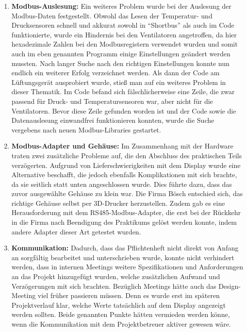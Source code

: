 \begin{enumerate}
	\item \textbf{Modbus-Auslesung:} Ein weiteres Problem wurde bei der Auslesung der Modbus-Daten festgestellt. Obwohl das Lesen der Temperatur- und Drucksensoren schnell und akkurat sowohl in \enquote{Shortbus} als auch im Code funktionierte, wurde ein Hindernis bei den Ventilatoren angetroffen, da hier hexadezimale Zahlen bei den Modbusregistern verwendet wurden und somit auch im eben genannten Programm einige Einstellungen geändert werden mussten. Nach langer Suche nach den richtigen Einstellungen konnte nun endlich ein weiterer Erfolg verzeichnet werden. Als dann der Code am Lüftungsgerät ausprobiert wurde, stieß man auf ein weiteres Problem in dieser Thematik. Im Code befand sich fälschlicherweise eine Zeile, die zwar passend für Druck- und Temperatursensoren war, aber nicht für die Ventilatoren. Bevor diese Zeile gefunden worden ist und der Code sowie die Datenauslesung einwandfrei funktionieren konnten, wurde die Suche vergebens nach neuen Modbus-Libraries gestartet.
	\item \textbf{Modbus-Adapter und Gehäuse:} Im Zusammenhang mit der Hardware traten zwei zusätzliche Probleme auf, die den Abschluss des praktischen Teils verzögerten. Aufgrund von Lieferschwierigkeiten mit dem Display wurde eine Alternative beschafft, die jedoch ebenfalls Komplikationen mit sich brachte, da sie seitlich statt unten angeschlossen wurde. Dies führte dazu, dass das zuvor ausgewählte Gehäuse zu klein war. Die Firma Bösch entschied sich, das richtige Gehäuse selbst per 3D-Drucker herzustellen. Zudem gab es eine Herausforderung mit dem RS485-Modbus-Adapter, die erst bei der Rückkehr in die Firma nach Beendigung des Praktikums gelöst werden konnte, indem andere Adapter dieser Art getestet wurden.
	\item \textbf{Kommunikation:} Dadurch, dass das Pflichtenheft nicht direkt von Anfang an sorgfältig bearbeitet und unterschrieben wurde, konnte nicht verhindert werden, dass in internen Meetings weitere Spezifikationen und Anforderungen an das Projekt hinzugefügt wurden, welche zusätzlichen Aufwand und Verzögerungen mit sich brachten. Bezüglich Meetings hätte auch das Design-Meeting viel früher passieren müssen. Denn es wurde erst im späteren Projektverlauf klar, welche Werte tatsächlich auf dem Display angezeigt werden sollten. Beide genannten Punkte hätten vermieden werden könne, wenn die Kommunikation mit dem Projektbetreuer aktiver gewesen wäre.
\end{enumerate}
